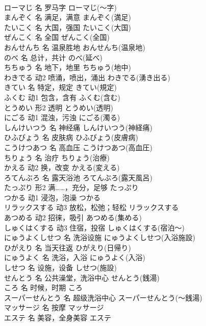 \documentclass[8pt]{extreport}
\begin{document}
\begin{CJK}{UTF8}{min}
\\	ローマじ	名	罗马字	ローマじ(～字)	
\\	まんぞく	名	满足，满意	まんぞく(満足)	
\\	たいこく	名	大国，强国	たいこく(大国)	
\\	ぜんこく	名	全国	ぜんこく(全国)	
\\	おんせんち	名	温泉胜地	おんせんち(温泉地)	
\\	のべ	名	总计，共计	のべ(延べ)	
\\	ちちゅう	名	地下，地里	ちちゅう(地中)	
\\	わきでる	动2	喷涌，喷出，涌出	わきでる(湧き出る)	
\\	きてい	名	特定，规定	きてい(規定)	
\\	ふくむ	动1	包含，含有	ふくむ(含む)	
\\	とうめい	形2	透明	とうめい(透明)	
\\	にごる	动1	混浊，污浊	にごる(濁る)	
\\	しんけいつう	名	神经痛	しんけいつう(神経痛)	
\\	ひふびょう	名	皮肤病	ひふびょう(皮膚病)	
\\	こうけつあつ	名	高血压	こうけつあつ(高血圧)	
\\	ちりょう	名	治疗	ちりょう(治療)	
\\	かえる	动2	换，改变	かえる(変える)	
\\	ろてんぶろ	名	露天浴池	ろてんぶろ(露天風呂)	
\\	たっぷり	形2	满……，充分，足够	たっぷり	
\\	つかる	动1	浸泡，泡澡	つかる	
\\	リラックスする	动3	放松，松弛；轻松	リラックスする	
\\	あつめる	动2	招徕，吸引	あつめる(集める)	
\\	しゅくはくする	动3	住宿，投宿	しゅくはくする(宿泊～)	
\\	にゅうよくしせつ	名	洗浴设施	にゅうよくしせつ(入浴施設)	
\\	ひがえり	名	当天往返	ひがえり(日帰り)	
\\	にゅうよく	名	洗浴，入浴	にゅうよく(入浴)	
\\	しせつ	名	设施，设备	しせつ(施設)	
\\	せんとう	名	公共澡堂，洗浴中心	せんとう(銭湯)	
\\	ころ	名	时候，时期	ころ	
\\	スーパーせんとう	名	超级洗浴中心	スーパーせんとう(～銭湯)	
\\	マッサージ	名	按摩	マッサージ	
\\	エステ	名	美容，全身美容	エステ	

\end{CJK}
\end{document}

